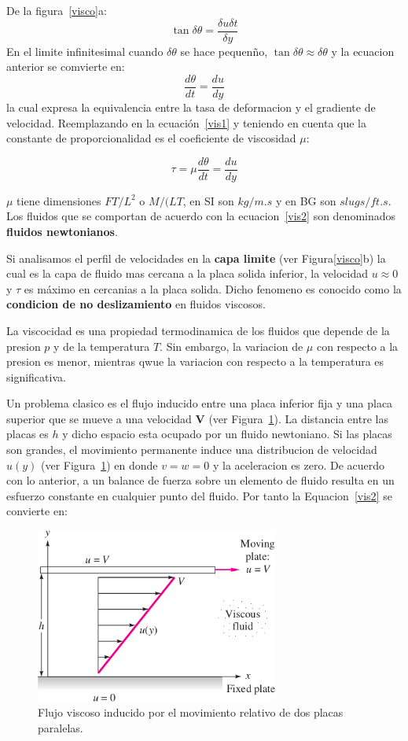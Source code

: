 \documentclass[10pt, oneside]{article}
\begin{document}
De la figura~\ref{visco}a:
$$
\tan \delta \theta = \frac{\delta u \delta t}{\delta y}
$$
En el limite infinitesimal cuando $\delta \theta$ se hace pequen\~no, $\tan \delta \theta \approx \delta \theta$ y la ecuacion anterior se comvierte en:
$$
\frac{d\theta}{dt}=\frac{du}{dy}
$$
la cual expresa la equivalencia entre la tasa de deformacion y el gradiente de velocidad. Reemplazando en la ecuaci\'on~\ref{vis1} y teniendo en cuenta que la constante de proporcionalidad es el coeficiente de viscosidad $\mu$:

\begin{equation}
\tau = \mu \frac{d \theta}{d t} = \frac{d u}{d y}
\label{vis2}
\end{equation}

$\mu$ tiene dimensiones ${FT/L^2}$ o ${M/(LT}$, en SI son $kg/m.s$ y en BG son $slugs/ft.s$. Los fluidos que se comportan de acuerdo con la ecuacion~\ref{vis2} son denominados \textbf{fluidos newtonianos}.

Si analisamos el perfil de velocidades en la \textbf{capa limite} (ver Figura\ref{visco}b) la cual es la capa de fluido mas cercana a la placa solida inferior, la velocidad $u \approx 0$ y $\tau$ es m\'aximo en cercanias a la placa solida. Dicho fenomeno es conocido como la \textbf{condicion de no deslizamiento} en fluidos viscosos. 

La viscocidad es una propiedad termodinamica de los fluidos que depende de la presion $p$ y de la temperatura $T$. Sin embargo, la variacion de $\mu$ con respecto a la presion es menor, mientras qwue la variacion con respecto a la temperatura es significativa.


Un problema  clasico es el flujo inducido entre una placa inferior fija y una placa superior que se mueve a una velocidad $\mathbf{V}$ (ver Figura~\ref{pla}). La distancia entre las placas es $h$ y dicho espacio esta ocupado por un fluido newtoniano. Si las placas son grandes, el movimiento permanente induce una distribucion de velocidad $u(y)$  (ver Figura~\ref{pla}) en donde $v=w=0$ y la aceleracion es zero. De acuerdo con lo anterior, a un balance de fuerza sobre un elemento de fluido resulta en un esfuerzo constante en cualquier punto del fluido. Por tanto la Equacion~\ref{vis2} se convierte en:

\begin{figure}[h]
\centering
\includegraphics[width=8cm]{plate}
\caption{Flujo viscoso inducido por el movimiento relativo de dos placas paralelas.}
\label{pla}
\end{figure}
\end{document}

